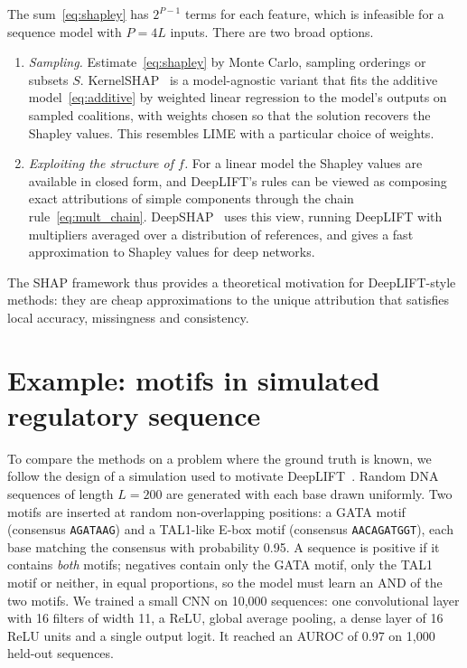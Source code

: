 The sum~\eqref{eq:shapley} has $2^{P-1}$ terms for each feature, which is infeasible for a sequence model with $P=4L$ inputs. There are two broad options.
\begin{enumerate}
  \item \emph{Sampling.} Estimate~\eqref{eq:shapley} by Monte Carlo, sampling orderings or subsets $S$. KernelSHAP~\citep{lundberg2017} is a model-agnostic variant that fits the additive model~\eqref{eq:additive} by weighted linear regression to the model's outputs on sampled coalitions, with weights chosen so that the solution recovers the Shapley values. This resembles LIME with a particular choice of weights.
  \item \emph{Exploiting the structure of $f$.} For a linear model the Shapley values are available in closed form, and DeepLIFT's rules can be viewed as composing exact attributions of simple components through the chain rule~\eqref{eq:mult_chain}. DeepSHAP~\citep{lundberg2017} uses this view, running DeepLIFT with multipliers averaged over a distribution of references, and gives a fast approximation to Shapley values for deep networks.
\end{enumerate}
The SHAP framework thus provides a theoretical motivation for DeepLIFT-style methods: they are cheap approximations to the unique attribution that satisfies local accuracy, missingness and consistency.

\section{Example: motifs in simulated regulatory sequence}
\label{sec:sim_example}

To compare the methods on a problem where the ground truth is known, we follow the design of a simulation used to motivate DeepLIFT~\citep{shrikumar2017}. Random DNA sequences of length $L=200$ are generated with each base drawn uniformly. Two motifs are inserted at random non-overlapping positions: a GATA motif (consensus \texttt{AGATAAG}) and a TAL1-like E-box motif (consensus \texttt{AACAGATGGT}), each base matching the consensus with probability 0.95. A sequence is positive if it contains \emph{both} motifs; negatives contain only the GATA motif, only the TAL1 motif or neither, in equal proportions, so the model must learn an AND of the two motifs. We trained a small CNN on 10,000 sequences: one convolutional layer with 16 filters of width 11, a ReLU, global average pooling, a dense layer of 16 ReLU units and a single output logit. It reached an AUROC of 0.97 on 1,000 held-out sequences.

